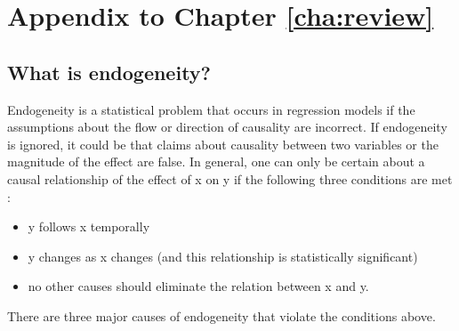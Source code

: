 \chapter{Appendix to Chapter \ref{cha:review}}


\section*{\label{sec:appendix_endogeneity}What is endogeneity?}
Endogeneity is a statistical problem that occurs in regression models if the assumptions about the flow or direction of causality are incorrect. If endogeneity is ignored, it could be that claims about causality between two variables or the magnitude of the effect are false. In general, one can only be certain about a causal relationship of the effect of x on y if the following three conditions are met \parencite{Antonakis2012}:

\begin{itemize}
\item	y follows x temporally
\item	y changes as x changes (and this relationship is statistically significant)
\item	no other causes should eliminate the relation between x and y.
\end{itemize}

There are three major causes of endogeneity that violate the conditions above.

